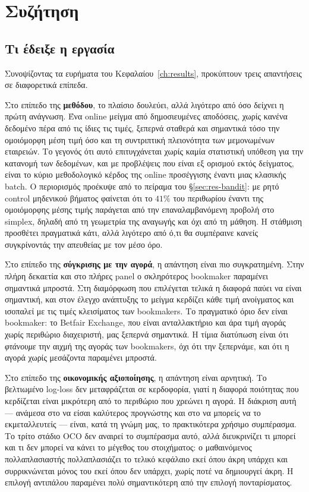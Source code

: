 \documentclass[12pt,a4paper,oneside]{report}
\renewcommand{\_}{\oldunderscore\allowbreak}
\theoremstyle{definition}
\theoremstyle{plain}
\theoremstyle{remark}
\begin{document}
\chapter{Συζήτηση}
\label{ch:discussion}

\section{Τι έδειξε η εργασία}

Συνοψίζοντας τα ευρήματα του Κεφαλαίου~\ref{ch:results}, προκύπτουν τρεις απαντήσεις σε
διαφορετικά επίπεδα.

Στο επίπεδο της \textbf{μεθόδου}, το πλαίσιο δουλεύει, αλλά λιγότερο από όσο δείχνει η
πρώτη ανάγνωση. Ένα online μείγμα από δημοσιευμένες αποδόσεις, χωρίς κανένα δεδομένο πέρα
από τις ίδιες τις τιμές, ξεπερνά σταθερά και σημαντικά τόσο την ομοιόμορφη μέση τιμή όσο και
τη συντριπτική πλειονότητα των μεμονωμένων εταιρειών. Το γεγονός ότι αυτό επιτυγχάνεται χωρίς
καμία στατιστική υπόθεση για την κατανομή των δεδομένων, και με προβλέψεις που είναι εξ
ορισμού εκτός δείγματος, είναι το κύριο μεθοδολογικό κέρδος της online προσέγγισης έναντι
μιας κλασικής batch. Ο περιορισμός προέκυψε από το πείραμα του \S\ref{sec:res-bandit}: με
ρητό control μηδενικού βήματος φαίνεται ότι το $41\%$ του περιθωρίου έναντι της ομοιόμορφης
μέσης τιμής παράγεται από την επαναλαμβανόμενη προβολή στο simplex, δηλαδή από τη γεωμετρία
της αναγωγής και όχι από τη μάθηση. Η στάθμιση προσθέτει πραγματικά κάτι, αλλά λιγότερο από
ό,τι θα συμπέραινε κανείς συγκρίνοντάς την απευθείας με τον μέσο όρο.

Στο επίπεδο της \textbf{σύγκρισης με την αγορά}, η απάντηση είναι πιο συγκρατημένη. Στην
πλήρη δεκαετία και στο πλήρες panel ο σκληρότερος bookmaker παραμένει σημαντικά μπροστά. Στη
διαμόρφωση που επιλέγεται τελικά η διαφορά παύει να είναι σημαντική, και στον έλεγχο
ανάπτυξης το μείγμα κερδίζει κάθε τιμή ανοίγματος και ισοπαλεί με τις τιμές κλεισίματος των
bookmakers. Το πραγματικό όριο δεν είναι bookmaker: το Betfair Exchange, που είναι
ανταλλακτήριο και άρα τιμή αγοράς χωρίς περιθώριο διαχειριστή, μας ξεπερνά σημαντικά. Η
τίμια διατύπωση είναι ότι \emph{φτάνουμε} την αιχμή της αγοράς των bookmakers, όχι ότι την
ξεπερνάμε, και ότι η αγορά χωρίς μεσάζοντα παραμένει μπροστά.

Στο επίπεδο της \textbf{οικονομικής αξιοποίησης}, η απάντηση είναι αρνητική. Το βελτιωμένο
log-loss δεν μεταφράζεται σε κερδοφορία, γιατί η διαφορά ποιότητας που κερδίζεται είναι
μικρότερη από το περιθώριο που χρεώνει η αγορά. Η διάκριση αυτή --- ανάμεσα στο να είσαι
καλύτερος προγνώστης και στο να μπορείς να το εκμεταλλευτείς --- είναι, κατά τη γνώμη μας,
το πρακτικότερα χρήσιμο συμπέρασμα. Το τρίτο στάδιο OCO δεν αναιρεί το συμπέρασμα αυτό,
αλλά διευκρινίζει τι μπορεί και τι δεν μπορεί να κάνει το μέγεθος του στοιχήματος: ο
μαθαινόμενος πολλαπλασιαστής πολλαπλασιάζει το τελικό κεφάλαιο εκεί όπου άκρη υπάρχει και
συρρικνώνεται μόνος του εκεί όπου δεν υπάρχει, χωρίς ποτέ να δημιουργεί άκρη. Η επιλογή
αντιπάλου παραμένει πολύ σημαντικότερη από την επιλογή πονταρίσματος.
\end{document}
